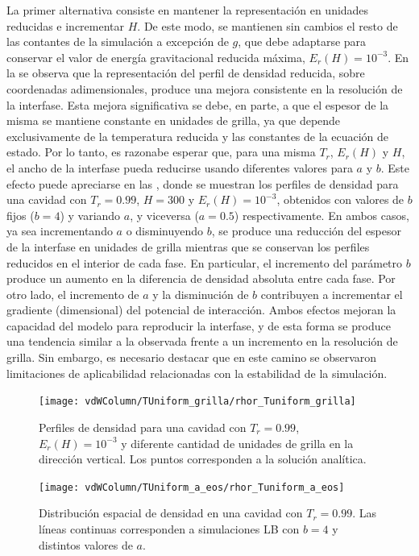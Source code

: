 La primer alternativa consiste en mantener la representaci\'on en unidades reducidas e incrementar $H$. De este modo, se mantienen sin cambios el resto de las contantes de la simulaci\'on a excepci\'on de $g$, que debe adaptarse para conservar el valor de energ\'ia gravitacional reducida m\'axima, $E_r(H) = 10^{-3}$. En la  se observa que la representaci\'on del perfil de densidad reducida, sobre coordenadas adimensionales, produce una mejora consistente en la resoluci\'on de la interfase. Esta mejora significativa se debe, en parte, a que el espesor de la misma se mantiene constante en unidades de grilla, ya que depende exclusivamente de la temperatura reducida y las constantes de la ecuaci\'on de estado. Por lo tanto, es razonabe esperar que, para una misma $T_r$, $E_r(H)$ y $H$, el ancho de la interfase pueda reducirse usando diferentes valores para $a$ y $b$. Este efecto puede apreciarse en las , donde se muestran los perfiles de densidad para una cavidad con $T_r=0.99$, $H=300$ y $E_r(H)=10^{-3}$, obtenidos con valores de $b$ fijos ($b=4$) y variando $a$, y viceversa ($a=0.5$) respectivamente. En ambos casos, ya sea incrementando $a$ o disminuyendo $b$, se produce una reducci\'on del espesor de la interfase en unidades de grilla mientras que se conservan los perfiles reducidos en el interior de cada fase. En particular, el incremento del par\'ametro $b$ produce un aumento en la diferencia de densidad absoluta entre cada fase. Por otro lado, el incremento de $a$ y la disminuci\'on de $b$ contribuyen a incrementar el gradiente (dimensional) del potencial de interacci\'on. Ambos efectos mejoran la capacidad del modelo \pp{} para reproducir la interfase, y de esta forma se produce una tendencia similar a la observada frente a un incremento en la resoluci\'on de grilla. Sin embargo, es necesario destacar que en este camino se observaron limitaciones de aplicabilidad relacionadas con la estabilidad de la simulaci\'on.

\begin{figure}[ht]
	\centering
	\texttt{[image: vdWColumn/TUniform\_grilla/rhor\_Tuniform\_grilla]}
	\caption{Perfiles de densidad para una cavidad con $T_r = 0.99$, $E_r(H) = 10^{-3}$ y diferente cantidad de unidades de grilla en la direcci\'on vertical. Los puntos corresponden a la soluci\'on anal\'itica.}
	\label{fig:vdWColumn_rhor_grilla}
\end{figure}
\FloatBarrier

\begin{figure}[ht]
	\centering
	\texttt{[image: vdWColumn/TUniform\_a\_eos/rhor\_Tuniform\_a\_eos]}
	\caption{Distribuci\'on espacial de densidad en una cavidad con $T_r = 0.99$. Las l\'ineas continuas corresponden a simulaciones LB con $b=4$ y distintos valores de $a$.}
	\label{fig:vdWColumn_a_eos}
\end{figure}
\FloatBarrier

